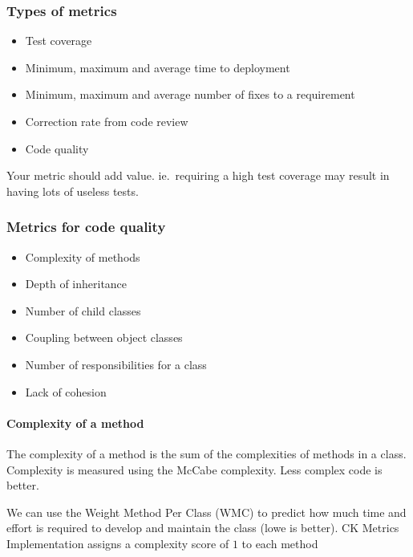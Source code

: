 \subsubsection{Types of metrics}\label{ssub:types_of_metrics}

\begin{itemize}
	\item Test coverage
	\item Minimum, maximum and average time to deployment
	\item Minimum, maximum and average number of fixes to a requirement
	\item Correction rate from code review
	\item Code quality
\end{itemize}

\begin{note}
	Your metric should add value. ie.\ requiring a high test coverage may result in having lots of useless tests.
\end{note}

\subsubsection{Metrics for code quality}\label{ssub:metrics_for_code_quality}

\begin{itemize}
	\item Complexity of methods
	\item Depth of inheritance
	\item Number of child classes
	\item Coupling between object classes
	\item Number of responsibilities for a class
	\item Lack of cohesion
\end{itemize}

\paragraph{Complexity of a method}\label{par:complexity_of_a_method}

The complexity of a method is the sum of the complexities of methods in a class.
Complexity is measured using the McCabe complexity.
Less complex code is better.

We can use the Weight Method Per Class (WMC) to predict how much time and effort is required to develop and maintain the class (lowe is better).
CK Metrics Implementation assigns a complexity score of \(1\) to each method

